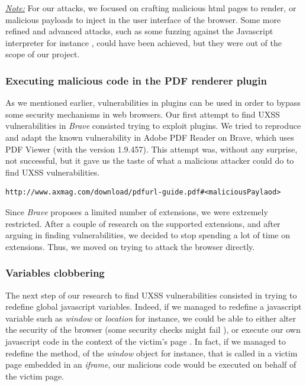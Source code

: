 \documentclass[journal]{IEEEtran}
\begin{document}
\medskip

\underline{\emph{Note:}} For our attacks, we focused on crafting malicious html pages to render, or malicious payloads to inject in the user interface of the browser. Some more refined and advanced attacks, such as some fuzzing  against the Javascript interpreter for instance \cite{microsoftFuzzingOnv8}, could have been achieved, but they were out of the scope of our project.

\subsubsection*{Executing malicious code in the PDF renderer plugin}

As we mentioned earlier, vulnerabilities in plugins can be used in order to bypass some security mechanisms in web browsers. Our first attempt to find UXSS vulnerabilities in \emph{Brave} consisted trying to exploit plugins. We tried to reproduce and adapt the known vulnerability in Adobe PDF Reader \cite{uxssPDF} on Brave, which uses PDF Viewer (with the version 1.9.457). This attempt was, without any surprise, not successful, but it gave us the taste of what a malicious attacker could do to find UXSS vulnerabilities.

\begin{lstlisting}[caption=The pattern we tried to use to execute malicious javascript using the PDF viewer]
http://www.axmag.com/download/pdfurl-guide.pdf#<maliciousPaylaod>
\end{lstlisting}

\medskip

Since \emph{Brave} proposes a limited number of extensions, we were extremely restricted. After a couple of research on the supported extensions, and after arguing in finding vulnerabilities, we decided to stop spending a lot of time on extensions. Thus, we moved on trying to attack the browser directly.

\subsubsection*{Variables clobbering}

The next step of our research to find UXSS vulnerabilities consisted in trying to redefine global javascript variables. Indeed, if we managed to redefine a javascript variable such as \emph{window} or \emph{location} for instance, we could be able to either alter the security of the browser (some security checks might fail \cite{frameBustingLocationClubbered}), or execute our own javascript code in the context of the victim's page \cite{uxssJSLeaks}. In fact, if we managed to redefine the method, of the \emph{window} object for instance, that is called in a victim page embedded in an \emph{iframe}, our malicious code would be executed on behalf of the victim page. 
\end{document}
